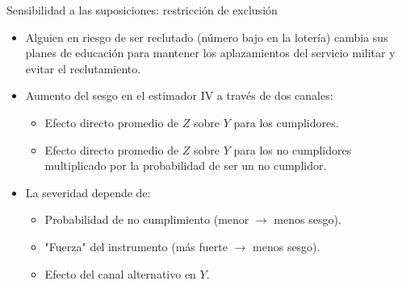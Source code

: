 \documentclass{beamer}
\begin{document}
		
\begin{frame}{Sensibilidad a las suposiciones: restricción de exclusión}
	
\begin{itemize}
	
\item Alguien en riesgo de ser reclutado (número bajo en la lotería) cambia sus planes de educación para mantener los aplazamientos del servicio militar y evitar el reclutamiento.

\item Aumento del sesgo en el estimador IV a través de dos canales:
		\begin{itemize}
		\item Efecto directo promedio de $Z$ sobre $Y$ para los cumplidores.
		\item Efecto directo promedio de $Z$ sobre $Y$ para los no cumplidores multiplicado por la probabilidad de ser un no cumplidor.
		\end{itemize}

\item La severidad depende de: 
		\begin{itemize}
		\item Probabilidad de no cumplimiento (menor $\rightarrow$ menos sesgo).
		\item "Fuerza" del instrumento (más fuerte $\rightarrow$ menos sesgo).
		\item Efecto del canal alternativo en $Y$.
		\end{itemize}
\end{itemize}

\end{frame}
\end{document}
